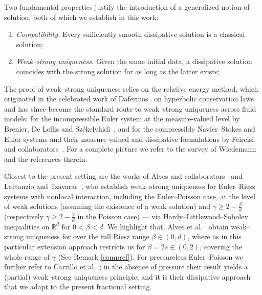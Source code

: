 \documentclass[12pt,a4paper,twoside]{article}
\numberwithin{equation}{section}%
\begin{document}
Two fundamental properties justify the introduction of a generalized notion of solution,
both of which we establish in this work:
\begin{enumerate}[leftmargin=*]
	\item[(i)] \emph{Compatibility.} Every sufficiently smooth dissipative
	solution is a classical solution; 
	\item[(ii)] \emph{Weak--strong uniqueness.} Given the same initial data, a dissipative
	solution coincides with the strong solution for as long as the latter exists; 
\end{enumerate}
The proof of weak--strong uniqueness relies on the relative energy method, which
originated in the celebrated work of Dafermos~\cite{D1979} on hyperbolic conservation
laws and has since become the standard route to weak--strong uniqueness across fluid
models: for the incompressible Euler system at the measure-valued level by Brenier,
De Lellis and Sz\'ekelyhidi~\cite{BDS11}, and for the compressible Navier--Stokes and
Euler systems and their measure-valued and dissipative formulations by Feireisl and
collaborators~\cite{FJN2012, FNS2011, FPAW2016, C2024, BF2018a}. For a complete picture
we refer to the survey of Wiedemann~\cite{W2018} and the references therein. \par 
Closest to the present setting are the works of Alves and collaborators~\cite{AlCC2024,
		Al2024, AlGT2026} and Lattanzio and Tzavaras~\cite{LT2017}, who establish weak--strong
	uniqueness for Euler--Riesz systems with nonlocal interaction, including the Euler--Poisson
	case, at the level of weak solutions (assuming the existence of a weak solution) and
	$\gamma\ge 2-\tfrac{\beta}{d}$ (respectively $\gamma\ge 2-\tfrac{2}{d}$ in the Poisson case) --- via Hardy--Littlewood--Sobolev inequalities on $\mathbb R^d$ for $0<\beta <d$.
We highlight that, Alves et al.~\cite{AlGT2026} obtain weak--strong uniqueness for over the full Riesz range $\beta\in(0,d)$, where as in this particular extension approach restricts us for $\beta=2s\in(0,2)$, covering the whole range of $\gamma$ (See Remark \ref{compref}). For pressureless Euler--Poisson we further refer to Carrillo et al.~\cite{CDGS2024}; in the
absence of pressure their result yields a (partial) weak--strong uniqueness principle, and it is
their dissipative approach that we adapt to the present fractional setting. \par 

\end{document}
